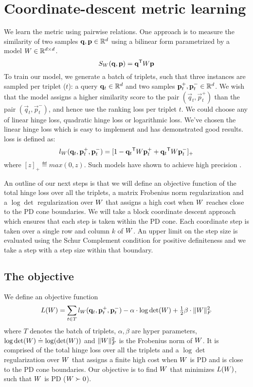 \documentclass{article}
\begin{document}
\section{Coordinate-descent metric learning}
We learn the metric using pairwise relations. One approach is to measure the similarity of two samples $\mathbf{q}, \mathbf{p} \in \mathbb{R}^d$ using a bilinear form parametrized by a model ${W} \in \mathbb{R}^{d \times d}$.
\begin{equation}
S_{{W}}(\mathbf{q}, \mathbf{p}) = \mathbf{q}{}^\mathsf{T} {W} \mathbf{p}
\end{equation}
To train our model, we generate a batch of triplets, such that three instances are sampled per triplet ($t$): a query $\mathbf{q}_t \in \mathbb{R}^d$ and two samples $\mathbf{p}_{t}^{+}, \mathbf{p}_{t}^{-} \in \mathbb{R}^d$. We wish that the model assigns a higher similarity score to the pair $(\vec{q}_t, \vec{p}_{t}^{+})$ than the pair $(\vec{q}_t, \vec{p}_{t}^{-})$, and hence use the ranking loss per triplet $t$. We could choose any of linear hinge loss, quadratic hinge loss or logarithmic loss. We've chosen the linear hinge loss which is easy to implement and has demonstrated good results.  loss is defined as:
\begin{equation}
l_{{W}}(\mathbf{q}_t, \mathbf{p}_{t}^{+}, \mathbf{p}_{t}^{-})=[1-\mathbf{q}_{t}{}^\mathsf{T} {W} \mathbf{p}_{t}^{+}+\mathbf{q}_{t}{}^\mathsf{T}{W}\mathbf{p}_{t}^{-}]_{+}
\label{hingelt}
\end{equation}
where $[z]_{+} \eqdef max(0,z)$. Such models have shown to achieve high precision \cite{oasis, qian}.

An outline of our next steps is that we will define an objective function of the total hinge loss over all the triplets, a matrix Frobenius norm regularization and a $\log \det$ regularization over ${W}$ that assigns a high cost when ${W}$ reaches close to the PD cone boundaries. 
We will take a block coordinate descent approach which ensures that each step is taken within the PD cone. Each coordinate step is taken over a single row and column $k$ of ${W}$. An upper limit on the step size is  evaluated using the Schur Complement condition for positive definiteness  and we take a step with a step size within that boundary. 

\subsection{The objective}
We define an objective function
\begin{equation}
L({W})=\sum\limits_{t\in T}{l_{{W}}(\mathbf{q}_t, \mathbf{p}_{t}^{+}, \mathbf{p}_{t}^{-})} - \alpha \cdot \log \det({W}) + \tfrac{1}{2} \beta \cdot \| {W} \|_{F}^{2} 
\end{equation}
where $T$ denotes the batch of triplets, $\alpha, \beta$ are hyper parameters,  $\log \det({W}) \doteq \log (\det({W}))$ and $\| {W} \|_{F}^{2}$ is the Frobenius norm of ${W}$. It is comprised of the total hinge loss over all the triplets and a $\log \det$ regularization over ${W}$ that assigns a finite high cost when ${W}$ is PD and is close to the PD cone boundaries. 
Our objective is to find ${W}$ that minimizes $L({W})$, such that ${W}$ is PD (${W}\succ 0$).
\end{document}
